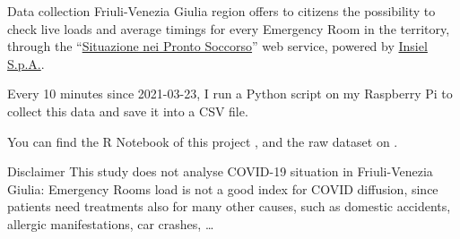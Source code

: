\documentclass[8pt,english,aspectratio=169]{beamer}
\begin{document}
\begin{frame}{Data collection}
Friuli-Venezia Giulia region offers to citizens the possibility to check live loads and average timings for every Emergency Room in the territory, through the ``\href{https://servizionline.sanita.fvg.it/psonline}{Situazione nei Pronto Soccorso}'' web service, powered by \href{https://www.insiel.it/}{Insiel S.p.A.}.

Every 10 minutes since 2021-03-23, I run a Python script on my Raspberry Pi to collect this data and save it into a CSV file.

\medskip
\begin{center}
\end{center}
\bigskip

You can find the R Notebook of this project \href{http://uniud.enricostefanel.it/datascience/project/FVG_emergency_rooms_situation.html}{\color{gray}{at this link}}, and the raw dataset on \href{https://www.kaggle.com/enstit/friuli-venezia-giulia-emergency-rooms-situation}{\color{gray}{Kaggle}}.

\begin{block}{Disclaimer}
This study does not analyse COVID-19 situation in Friuli-Venezia Giulia: Emergency Rooms load is not a good index for COVID diffusion, since patients need treatments also for many other causes, such as domestic accidents, allergic manifestations, car crashes, \dots 
\end{block}

\end{frame}
\end{document}
